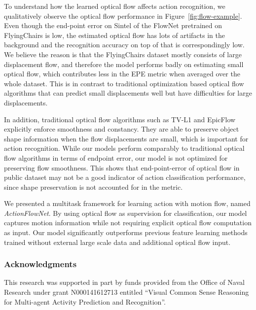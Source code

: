 \documentclass[10pt,twocolumn,letterpaper]{article}
\begin{document}
To understand how the learned optical flow affects action recognition, we qualitatively observe the optical flow performance in Figure~\ref{fig:flow-example}.
Even though the end-point error on Sintel of the FlowNet pretrained on FlyingChairs is low, the estimated optical flow has lots of artifacts in the background and the recognition accuracy on top of that is correspondingly low.
We believe the reason is that the FlyingChairs dataset mostly consists of large displacement flow, and therefore the model performs badly on estimating small optical flow, which contributes less in the EPE metric when averaged over the whole dataset.
This is in contrast to traditional optimization based optical flow algorithms that can predict small displacements well but have difficulties for large displacements.


In addition, traditional optical flow algorithms such as TV-L1 and EpicFlow explicitly enforce smoothness and constancy. They are able to preserve object shape information when the flow displacements are small, which is important for action recognition.
While our models perform comparably to traditional optical flow algorithms in terms of endpoint error, our model is not optimized for preserving flow smoothness. 
This shows that end-point-error of optical flow in public dataset may not be a good indicator of action classification performance, since shape preservation is not accounted for in the metric.


We presented a multitask framework for learning action with motion flow, named \emph{ActionFlowNet}. 
By using optical flow as supervision for classification, our model captures motion information while not requiring explicit optical flow computation as input.
Our model significantly outperforms previous feature learning methods trained without external large scale data and additional optical flow input.

\subsubsection*{Acknowledgments}
This research was supported in part by funds provided from
the Office of Naval Research under grant N000141612713
entitled ``Visual Common Sense Reasoning for Multi-agent
Activity Prediction and Recognition''.


{\small


}
\end{document}
